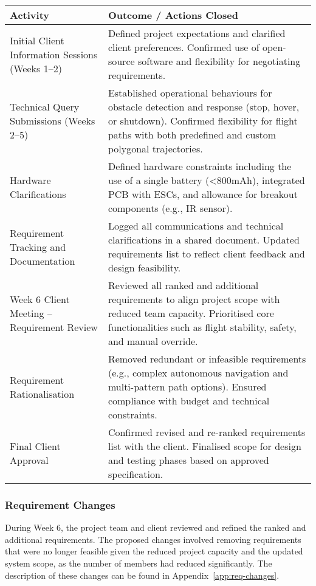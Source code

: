 \begin{tabular}{|p{4cm}|p{11.5cm}|}
\hline
\rowcolor{gray!15}
\textbf{Activity} & \textbf{Outcome / Actions Closed} \\
\hline
Initial Client Information Sessions (Weeks 1–2) & Defined project expectations and clarified client preferences. Confirmed use of open-source software and flexibility for negotiating requirements. \\ \hline
Technical Query Submissions (Weeks 2–5) & Established operational behaviours for obstacle detection and response (stop, hover, or shutdown). Confirmed flexibility for flight paths with both predefined and custom polygonal trajectories. \\ \hline
Hardware Clarifications & Defined hardware constraints including the use of a single battery (<800mAh), integrated PCB with ESCs, and allowance for breakout components (e.g., IR sensor). \\ \hline
Requirement Tracking and Documentation & Logged all communications and technical clarifications in a shared document. Updated requirements list to reflect client feedback and design feasibility. \\ \hline
Week 6 Client Meeting – Requirement Review & Reviewed all ranked and additional requirements to align project scope with reduced team capacity. Prioritised core functionalities such as flight stability, safety, and manual override. \\ \hline
Requirement Rationalisation & Removed redundant or infeasible requirements (e.g., complex autonomous navigation and multi-pattern path options). Ensured compliance with budget and technical constraints. \\ \hline
Final Client Approval & Confirmed revised and re-ranked requirements list with the client. Finalised scope for design and testing phases based on approved specification. \\ \hline
\end{tabular}

\subsubsection{Requirement Changes} \leavevmode

During Week 6, the project team and client reviewed and refined the ranked and additional requirements.  The proposed changes involved removing requirements that were no longer feasible given the reduced project capacity and the updated system scope, as the number of members had reduced significantly. The description of these changes can be found in Appendix~\ref{app:req-changes}.